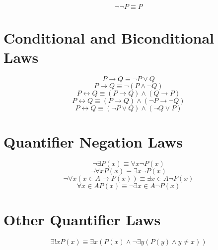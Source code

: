 \documentclass[11pt]{article}
\newcommand{\then}{\rightarrow}
\newcommand{\bicond}{\leftrightarrow}
\begin{document}
$$\neg \neg P \equiv P$$

\section{Conditional and Biconditional Laws}

$$P \then Q \equiv \neg P \vee Q$$
$$P \then Q \equiv \neg (P \wedge \neg Q)$$
$$P \bicond Q \equiv (P \then Q) \wedge (Q \then P)$$
$$P \bicond Q \equiv (P \then Q) \wedge (\neg P \then \neg Q)$$
$$P \bicond Q \equiv (\neg P \vee Q) \wedge (\neg Q \vee P)$$

\section{Quantifier Negation Laws}

$$\neg \exists P(x) \equiv \forall x \neg P(x)$$
$$\neg \forall x P(x) \equiv \exists x \neg P(x)$$
$$\neg \forall x (x \in A \then P(x)) \equiv \exists x \in A \neg P(x)$$
$$\forall x \in A P(x) \equiv \neg \exists x \in A \neg P(x)$$

\section{Other Quantifier Laws}

$$\exists! x P(x) \equiv \exists x (P(x) \wedge \neg \exists y (P(y) \wedge y \neq x))$$
\end{document}
